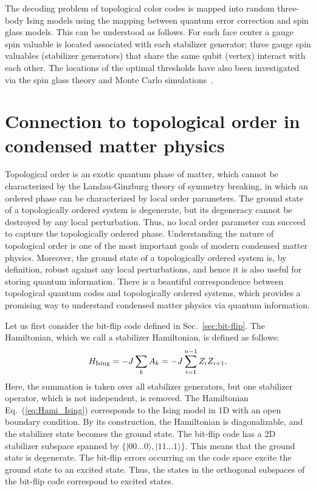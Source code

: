 The decoding problem of topological color codes is mapped into random three-body Ising models using the mapping between quantum error correction and spin glass models. 
This can be understood as follows. 
For each face center a gauge spin valuable 
is located associated with each stabilizer generator;
three gauge spin valuables (stabilizer generators) 
that share the same qubit (vertex)
interact with each other.
The locations of the optimal thresholds have also been investigated via the spin glass theory and Monte Carlo simulations~\cite{OhzekiColor,BombinOhzeki}.


\section{Connection to topological order in condensed matter physics}
Topological order is an exotic quantum phase of matter, which cannot be characterized by the Landau-Ginzburg theory of symmetry breaking, in which an ordered phase can be characterized by local order parameters.
The ground state of a topologically ordered system is degenerate, but its degeneracy cannot be destroyed by any local perturbation. 
Thus, no local order parameter can succeed to capture the topologically ordered phase.
Understanding the nature of topological order is one of the most important goals of modern condensed matter physics.
Moreover, the ground state of a topologically ordered system is, by definition, robust against any local perturbations, and hence it is also useful for storing quantum information.
There is a beautiful correspondence between topological quantum codes and topologically ordered systems, which provides a promising way to understand condensed matter physics
via quantum information.

Let us first consider the bit-flip code defined in Sec.~\ref{sec:bit-flip}.
The Hamiltonian, which we call a stabilizer Hamiltonian, is defined as follows:
\begin{eqnarray}
H_{\rm Ising} = - J \sum _k A_k = -J \sum _{i=1}^{n-1} Z_iZ_{i+1}.
\label{eq:Hami_Ising}
\end{eqnarray}
Here, the summation is taken over all stabilizer generators, but one stabilizer operator, which is not independent, is removed.
The Hamiltonian Eq.\ (\ref{eq:Hami_Ising}) corresponds to the Ising model in 1D with an open boundary condition.
By its construction, the Hamiltonian is diagonalizable, and the stabilizer state becomes the ground state.
The bit-flip code has a 2D stabilizer subspace spanned by $\{ |00...0\rangle, |11...1\rangle\}$.
This means that the ground state is degenerate.
The bit-flip errors occurring on the code space excite the ground state to an excited state.
Thus, the states in the orthogonal subspaces of the bit-flip code correspond to excited states.

